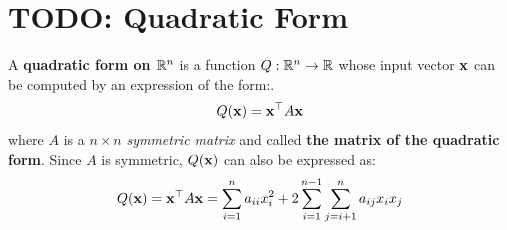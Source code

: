 \section{TODO: Quadratic Form}
    \begin{Def}\label{def-quadratic}
        A \textbf{quadratic form on $\mathbb{R}^n$} is a function $Q: \mathbb{R}^n\to \mathbb{R}$ whose input vector $\mathbf{x}$ can be computed by an expression of the form:.
        \begin{equation*}
            Q(\mathbf{x}) = \mathbf{x}^{\top}A\mathbf{x}
        \end{equation*}
        where $A$ is a $n\times n$ \textit{symmetric matrix} and called \textbf{the matrix of the quadratic form}. Since $A$ is symmetric, $Q(\mathbf{x})$ can also be expressed as:
        \begin{equation*}
            Q(\mathbf{x}) = \mathbf{x}^{\top}A\mathbf{x} = \sum_{i = 1}^n a_{ii}x_i^2 + 2\sum_{i = 1}^{n - 1}\sum_{j = i + 1}^n a_{ij}x_{i}x_{j}
        \end{equation*}
    \end{Def}
